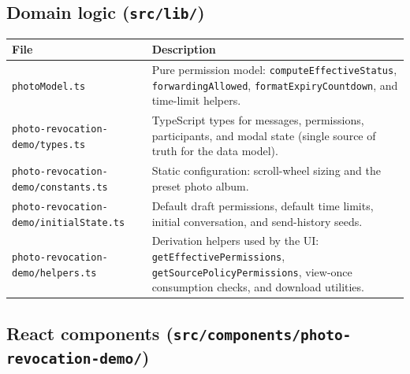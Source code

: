\subsection*{Domain logic (\texttt{src/lib/})}

\begin{center}
\small
\begin{tabular}{@{}P{4.6cm}P{9.0cm}@{}}
\hline
\textbf{File} & \textbf{Description} \\
\hline
\texttt{photoModel.ts} & Pure permission model: \texttt{computeEffectiveStatus}, \texttt{forwardingAllowed}, \texttt{formatExpiryCountdown}, and time-limit helpers. \\
\texttt{photo-revoca\-tion-demo/types.ts} & TypeScript types for messages, permissions, participants, and modal state (single source of truth for the data model). \\
\texttt{photo-revoca\-tion-demo/constants.ts} & Static configuration: scroll-wheel sizing and the preset photo album. \\
\texttt{photo-revoca\-tion-demo/initialState.ts} & Default draft permissions, default time limits, initial conversation, and send-history seeds. \\
\texttt{photo-revoca\-tion-demo/helpers.ts} & Derivation helpers used by the UI: \texttt{getEffectivePermissions}, \texttt{getSourcePolicyPermissions}, view-once consumption checks, and download utilities. \\
\hline
\end{tabular}
\end{center}

\subsection*{React components (\texttt{src/components/photo-revocation-demo/})}


